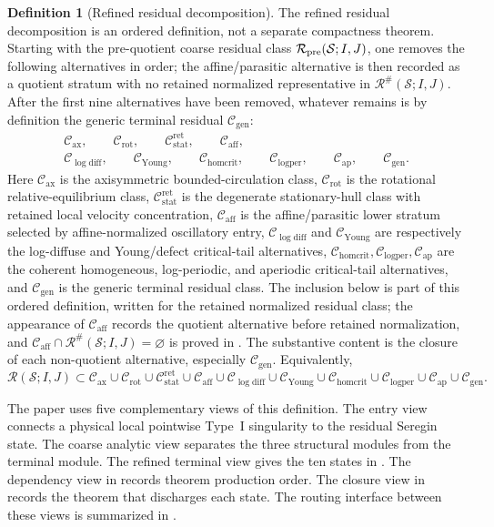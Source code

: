 \documentclass[11pt]{amsart}
\numberwithin{equation}{section}
\theoremstyle{plain}
\theoremstyle{definition}
\newtheorem{definition}[definition]{Definition}
\theoremstyle{remark}
\newcommand{\calS}{\mathcal S}
\newcommand{\calR}{\mathcal R}
\newcommand{\Cax}{\mathcal C_{\mathrm{ax}}}
\newcommand{\Crot}{\mathcal C_{\mathrm{rot}}}
\newcommand{\Cstat}{\mathcal C_{\mathrm{stat}}^{\mathrm{ret}}}
\newcommand{\Caff}{\mathcal C_{\mathrm{aff}}}
\newcommand{\Cgen}{\mathcal C_{\mathrm{gen}}}
\newcommand{\Chomcrit}{\mathcal C_{\mathrm{homcrit}}}
\newcommand{\Clogper}{\mathcal C_{\mathrm{logper}}}
\newcommand{\Capcrit}{\mathcal C_{\mathrm{ap}}}
\newcommand{\Cyoung}{\mathcal C_{\mathrm{Young}}}
\newcommand{\Clogdiff}{\mathcal C_{\log\mathrm{diff}}}
\begin{document}
\begin{definition}[Refined residual decomposition]
\label{def:refined-decomposition}
The refined residual decomposition is an ordered definition, not a separate
compactness theorem.  Starting with the pre-quotient coarse residual class
\(\calR_{\rm pre}(\calS;I,J)\), one removes the following alternatives in
order; the affine/parasitic alternative is then recorded as a quotient stratum
with no retained normalized representative in \(\calR^\#(\calS;I,J)\).  After
the first nine alternatives have been removed, whatever remains is by definition
the generic terminal residual \(\Cgen\):
\[
\begin{gathered}
   \Cax,\qquad \Crot,\qquad \Cstat,\qquad \Caff,\\
   \Clogdiff,\qquad \Cyoung,\qquad
   \Chomcrit,\qquad \Clogper,\qquad \Capcrit,\qquad \Cgen .
\end{gathered}
\]
Here \(\Cax\) is the axisymmetric bounded-circulation class, \(\Crot\) is the
rotational relative-equilibrium class, \(\Cstat\) is the degenerate
stationary-hull class with retained local velocity concentration, \(\Caff\) is the
affine/parasitic lower stratum selected by affine-normalized oscillatory entry,
\(\Clogdiff\) and \(\Cyoung\) are respectively the log-diffuse and Young/defect
critical-tail alternatives, \(\Chomcrit,\Clogper,\Capcrit\) are the coherent
homogeneous, log-periodic, and aperiodic critical-tail alternatives, and \(\Cgen\)
is the generic terminal residual class.  The inclusion below is part of this
ordered definition, written for the retained normalized residual class; the
appearance of \(\Caff\) records the quotient alternative before retained
normalization, and \(\Caff\cap\calR^\#(\calS;I,J)=\varnothing\) is proved in
.  The substantive content is the
closure of each non-quotient alternative, especially \(\Cgen\).  Equivalently,
\begin{equation}\label{eq:complete-residual-decomposition}
   \calR(\calS;I,J)
   \subset
   \Cax\cup\Crot\cup\Cstat\cup\Caff
   \cup\Clogdiff\cup\Cyoung\cup\Chomcrit\cup\Clogper\cup\Capcrit
   \cup\Cgen .
\end{equation}
\end{definition}

The paper uses five complementary views of this definition.  The entry view
connects a physical local pointwise Type~I singularity to the residual Seregin
state.  The coarse analytic view separates the three structural modules from
the terminal module.  The refined terminal view gives the ten states in
.  The dependency view in
 records theorem
production order.  The closure view in  records the
theorem that discharges each state.  The routing interface between these views
is summarized in .
\end{document}
